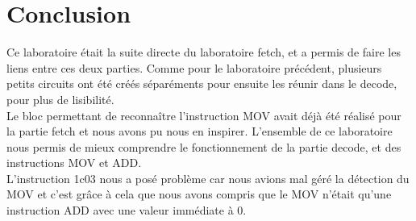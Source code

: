 \documentclass[a4paper]{article} %
\begin{document}
\section{Conclusion}
Ce laboratoire était la suite directe du laboratoire fetch, et a permis de faire les liens entre ces deux parties. Comme pour le laboratoire précédent, plusieurs petits circuits ont été 
créés séparéments pour ensuite les réunir dans le decode, pour plus de lisibilité.\\
Le bloc permettant de reconnaître l'instruction MOV avait déjà été réalisé pour la partie fetch et nous avons pu nous en inspirer. L'ensemble de ce laboratoire nous permis de mieux comprendre le fonctionnement de la partie decode, et des instructions MOV et ADD.\\
L'instruction 1c03 nous a posé problème car nous avions mal géré la détection du MOV et c'est grâce à cela que nous avons compris que le MOV n'était qu'une instruction ADD avec une valeur immédiate à 0.
\end{document}
